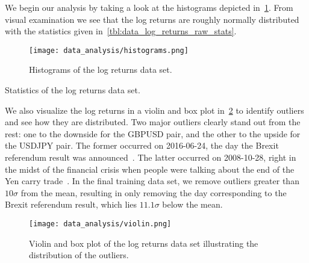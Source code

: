 We begin our analysis by taking a look at the histograms depicted in~\cref{fig:histograms_raw}.
From visual examination we see that the log returns are roughly normally distributed with the statistics given in~\cref{tbl:data_log_returns_raw_stats}.
\begin{figure}[!htb]
    \begin{center}
        \texttt{[image: data\_analysis/histograms.png]}
    \end{center}
    \caption{Histograms of the log returns data set.}
    \label{fig:histograms_raw}
\end{figure}

\begin{table}[!htb]
    \centering
    \begin{adjustbox}{max width=\textwidth}
        
    \end{adjustbox}
    \caption{Statistics of the log returns data set.}
    \label{tbl:data_log_returns_raw_stats}
\end{table}

We also visualize the log returns in a violin and box plot in~\cref{fig:violin_raw} to identify outliers and see how they are distributed.
Two major outliers clearly stand out from the rest: one to the downside for the GBPUSD pair, and the other to the upside for the USDJPY pair.
The former occurred on 2016-06-24, the day the Brexit referendum result was announced~\cite{brexit_gov_uk}.
The latter occurred on 2008-10-28, right in the midst of the financial crisis when people were talking about the end of the Yen carry trade~\cite{jpy_carry_trade_nyt}.
In the final training data set, we remove outliers greater than \( 10\sigma \) from the mean, resulting in only removing the day corresponding to the Brexit referendum result, which lies \( 11.1\sigma \) below the mean.
\begin{figure}[!htb]
    \begin{center}
        \texttt{[image: data\_analysis/violin.png]}
    \end{center}
    \caption{Violin and box plot of the log returns data set illustrating the distribution of the outliers.}
    \label{fig:violin_raw}
\end{figure}

